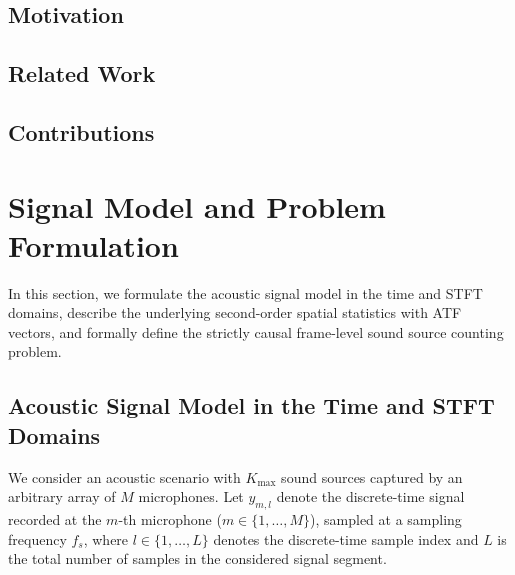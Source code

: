 \documentclass[lettersize,journal]{IEEEtran}
\begin{document}
\subsection{Motivation}
\IEEEpubidadjcol

\subsection{Related Work}

\subsection{Contributions}


\section{Signal Model and Problem Formulation}
\label{sec:signal_model}

In this section, we formulate the acoustic signal model in the time and \gls{STFT} domains, describe the underlying second-order spatial statistics with \gls{ATF} vectors, and formally define the strictly causal frame-level sound source counting problem.

\subsection{Acoustic Signal Model in the Time and STFT Domains}
\label{sec:signal_model_stft}
We consider an acoustic scenario with $K_{\mathrm{max}}$ sound sources captured by an arbitrary array of $M$ microphones. Let $y_{m,l}$ denote the discrete-time signal recorded at the $m$-th microphone ($m \in \{1, \ldots, M\}$), sampled at a sampling frequency $f_s$, where $l \in \{1, \ldots, L\}$ denotes the discrete-time sample index and $L$ is the total number of samples in the considered signal segment.
\end{document}
